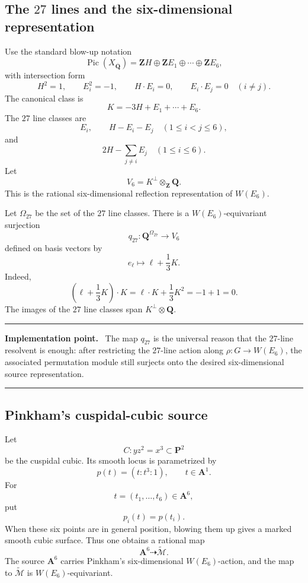 \documentclass[11pt]{article}
\newcommand{\QQ}{\mathbf{Q}}
\newcommand{\ZZ}{\mathbf{Z}}
\newcommand{\PP}{\mathbf{P}}
\newcommand{\Aff}{\mathbf{A}}
\newcommand{\ol}[1]{\overline{#1}}
\newcommand{\Pic}{\operatorname{Pic}}
\newcommand{\tcM}{\widetilde{\mathcal{M}}}
\newcommand{\W}{W(E_6)}
\newcommand{\V}{V_6}
\newenvironment{implementationbox}{%
  \begin{center}\begin{minipage}{0.94\textwidth}\small
  \hrule\vspace{0.55em}\textbf{Implementation point.}\ }{%
  \vspace{0.55em}\hrule\end{minipage}\end{center}%
}
\begin{document}
\subsection{The $27$ lines and the six-dimensional representation}

Use the standard blow-up notation
\[
  \Pic(X_{\ol\QQ})=\ZZ H\oplus \ZZ E_1\oplus\cdots\oplus\ZZ E_6,
\]
with intersection form
\[
  H^2=1,
  \qquad
  E_i^2=-1,
  \qquad
  H\cdot E_i=0,
  \qquad
  E_i\cdot E_j=0\quad(i\neq j).
\]
The canonical class is
\[
  K=-3H+E_1+\cdots+E_6.
\]
The $27$ line classes are
\[
  E_i,\qquad
  H-E_i-E_j\quad(1\leq i<j\leq6),
\]
and
\[
  2H-\sum_{j\neq i}E_j\quad(1\leq i\leq6).
\]
Let
\[
  \V=K^\perp\otimes_\ZZ\QQ.
\]
This is the rational six-dimensional reflection representation of $\W$.

Let $\Omega_{27}$ be the set of the $27$ line classes.  There is a
$W(E_6)$-equivariant surjection
\begin{equation}
  q_{27}:\QQ^{\Omega_{27}}\longrightarrow \V
  \label{eq:q27}
\end{equation}
defined on basis vectors by
\begin{equation}
  e_\ell\longmapsto \ell+\frac{1}{3}K.
  \label{eq:line-projection}
\end{equation}
Indeed,
\[
  \left(\ell+\frac{1}{3}K\right)\cdot K
  =\ell\cdot K+\frac{1}{3}K^2
  =-1+1=0.
\]
The images of the $27$ line classes span $K^\perp\otimes\QQ$.

\begin{implementationbox}
The map $q_{27}$ is the universal reason that the $27$-line resolvent is enough:
after restricting the $27$-line action along $\rho:G\to W(E_6)$, the associated
permutation module still surjects onto the desired six-dimensional source
representation.
\end{implementationbox}

\subsection{Pinkham's cuspidal-cubic source}

Let
\[
  C:yz^2=x^3\subset\PP^2
\]
be the cuspidal cubic.  Its smooth locus is parametrized by
\[
  p(t)=(t:t^3:1),\qquad t\in\Aff^1.
\]
For
\[
  t=(t_1,\ldots,t_6)\in\Aff^6,
\]
put
\[
  p_i(t)=p(t_i).
\]
When these six points are in general position, blowing them up gives a marked
smooth cubic surface.  Thus one obtains a rational map
\[
  \Aff^6\dashrightarrow \tcM.
\]
The source $\Aff^6$ carries Pinkham's six-dimensional $W(E_6)$-action, and the map
to $\tcM$ is $W(E_6)$-equivariant.
\end{document}
